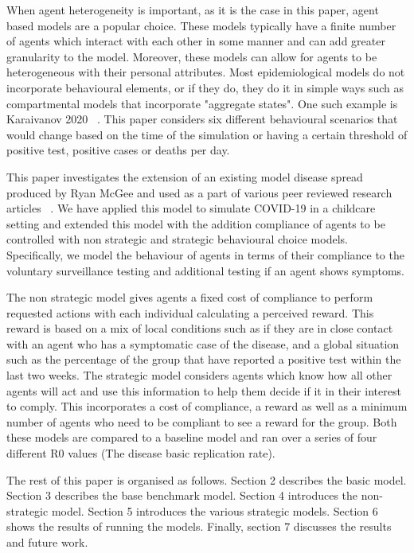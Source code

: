 \documentclass{article}
\begin{document}
When agent heterogeneity is important, as it is the case in this paper, agent based models are a popular choice. 
These models typically have a finite number of agents which interact with each other in some manner and can add greater granularity to the model.
Moreover, these models can allow for agents to be heterogeneous with their personal attributes.\newline
Most epidemiological models do not incorporate behavioural elements, or if they do, they do it in simple ways such as compartmental models that incorporate "aggregate states". One such example is Karaivanov 2020 ~\cite{karaivanov_2020}. This paper considers six different behavioural scenarios that would change based on the time of the simulation or having a certain threshold of positive test, positive cases or deaths per day.\newline

This paper investigates the extension of an existing model disease spread produced by Ryan McGee and used as a part of various peer reviewed research articles ~\cite{mcgee_homburger_williams_bergstrom_zhou_2021,mcgee_homburger_williams_bergstrom_zhou_2021_2}. 
We have applied this model to simulate COVID-19 in a childcare setting and extended this model with the addition compliance of agents to be controlled with non strategic and strategic behavioural choice models. Specifically, we model the behaviour of agents in terms of their compliance to the voluntary surveillance testing and additional testing if an agent shows symptoms. \newline

The non strategic model gives agents a fixed cost of compliance to perform requested actions with each individual calculating a perceived reward. This reward is based on a mix of local conditions such as if they are in close contact with an agent who has a symptomatic case of the disease, and a global situation such as the percentage of the group that have reported a positive test within the last two weeks. The strategic model considers agents which know how all other agents will act and use this information to help them decide if it in their interest to comply. This incorporates a cost of compliance, a reward as well as a minimum number of agents who need to be compliant to see a reward for the group. Both these models are compared to a baseline model and ran over a series of four different R0 values (The disease basic replication rate).  \newline

The rest of this paper is organised as follows. Section 2 describes the basic model. Section 3 describes the base benchmark model. Section 4 introduces the non-strategic model. Section 5 introduces the various strategic models. Section 6 shows the results of running the models. Finally, section 7 discusses the results and future work.
\end{document}
